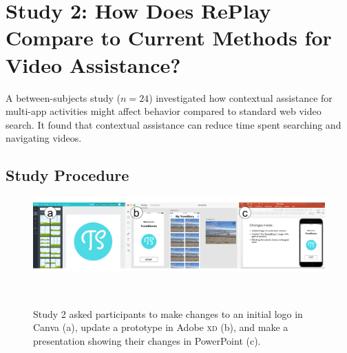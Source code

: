 \section{Study 2: How Does RePlay Compare to Current Methods for Video Assistance?}
\label{sec:replay_study}

A between-subjects study ($n\!=\!24$) investigated how contextual assistance for multi-app activities might affect behavior compared to standard web video search. It found that contextual assistance can reduce time spent searching and navigating videos.

\subsection{Study Procedure}

\begin{figure}[b!]
\centering
\includegraphics[width=\textwidth]{replay/figures/study2_task.png}
  \caption{Study 2 asked participants to make changes to an initial logo in Canva (a), update a prototype in Adobe \textsc{xd} (b), and make a presentation showing their changes in PowerPoint (c).}~\label{fig:replay-study2-task}

\end{figure}

